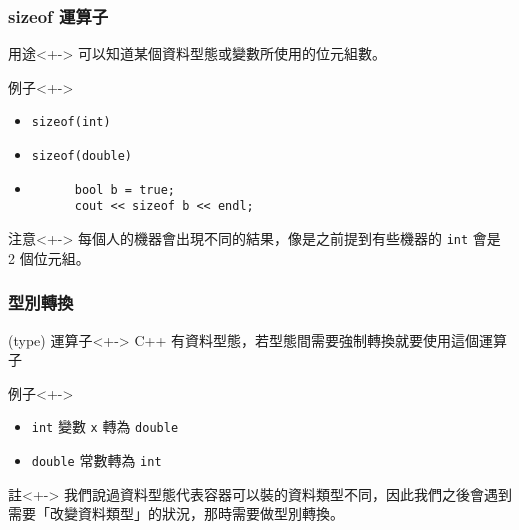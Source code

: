 \documentclass[utf8]{beamer}
\begin{document}
\begin{CJK}{UTF8}{bkai}
\begin{frame}[fragile]
  \frametitle{sizeof 運算子}
  \begin{block}{用途}<+->
  可以知道某個\alert{資料型態}或\alert{變數}所使用的位元組數。
  \end{block}
  \begin{exampleblock}{例子}<+->
    \begin{itemize}
    \item \lstinline{sizeof(int)}{}
    \item<+-> \lstinline{sizeof(double)}{}
    \item<+->
      \begin{lstlisting}
      bool b = true;
      cout << sizeof b << endl;
      \end{lstlisting}
    \end{itemize}
  \end{exampleblock}
  \begin{alertblock}{注意}<+->
  每個人的機器會出現不同的結果，像是之前提到有些機器的 \lstinline{int}{} 會是 2 個位元組。
  \end{alertblock}
\end{frame}

\begin{frame}[fragile]
  \frametitle{型別轉換}
  \begin{block}{(type) 運算子}<+->
  C++ 有資料型態，若型態間需要\alert{強制轉換}就要使用這個運算子
  \end{block}
  \begin{exampleblock}{例子}<+->
    \begin{itemize}
    \item \lstinline{int}{} 變數 \lstinline{x}{} 轉為 \lstinline{double}{} %
    \item<+-> \lstinline{double}{} 常數轉為 \lstinline{int}{} %
    \end{itemize}
  \end{exampleblock}
  \begin{alertblock}{註}<+->
  我們說過資料型態代表容器可以裝的資料類型不同，因此我們之後會遇到需要「\alert{改變資料類型}」的狀況，那時需要做型別轉換。
  \end{alertblock}
\end{frame}


\end{CJK}
\end{document}
